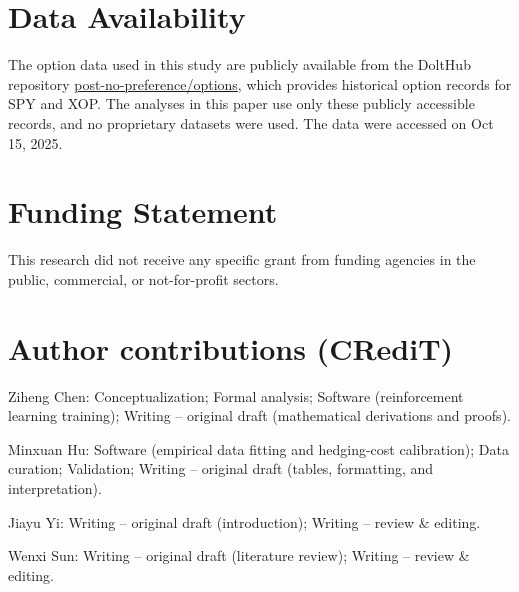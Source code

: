 \section*{Data Availability}
The option data used in this study are publicly available from the DoltHub repository \href{https://www.dolthub.com/repositories/post-no-preference/options}{post-no-preference/options}, which provides historical option records for SPY and XOP. The analyses in this paper use only these publicly accessible records, and no proprietary datasets were used. The data were accessed on Oct 15, 2025.

\section*{Funding Statement}
This research did not receive any specific grant from funding agencies in the public, commercial, or not-for-profit sectors.

\section*{Author contributions (CRediT)}
Ziheng Chen: Conceptualization; Formal analysis; Software (reinforcement learning training); Writing -- original draft (mathematical derivations and proofs).

Minxuan Hu: Software (empirical data fitting and hedging-cost calibration); Data curation; Validation; Writing -- original draft (tables, formatting, and interpretation).

Jiayu Yi: Writing -- original draft (introduction); Writing -- review \& editing.

Wenxi Sun: Writing – original draft (literature review); Writing -- review \& editing.

